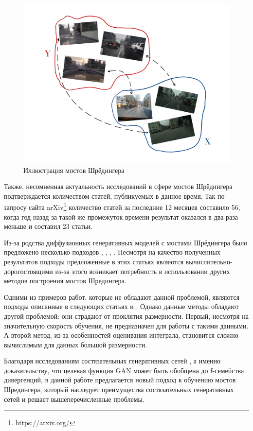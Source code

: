 \begin{figure}
    \centering
    \includegraphics[scale=0.2]{images/bridges_example.jpg}
    \caption{Иллюстрация мостов Шрёдингера}
    \label{fig:bridges_example}
\end{figure}

Также, несомненная актуальность исследований в сфере мостов Шрёдингера подтверждается количеством статей, публикуемых в данное время. Так по запросу сайта arXiv\footnote{https://arxiv.org/} количество статей за последние 12 месяцев составило 56, когда год назад за такой же промежуток времени результат оказался в два раза меньше и составил 23 статьи.

Из-за родства диффузионных генеративных моделей с мостами Шрёдингера было предложено несколько подходов \cite{dsb}, \cite{dsbm}, \cite{mle-sb}, \cite{cycle-sb}. Несмотря на качество полученных результатов подходы предложенные в этих статьях являются вычислительно-дорогостоящими из-за этого возникает потребность в использовании других методов построения мостов Шредингера. 

Одними из примеров работ, которые не обладают данной проблемой, являются подходы описанные в следующих статьях \cite{lsb} и \cite{pavon-empiric-fortret}. Однако данные методы обладают другой проблемой: они страдают от проклятия размерности. Первый, несмотря на значительную скорость обучения, не предназначен для работы с такими данными. А второй метод, из-за особенностей оценивания интеграла, становится сложно вычислимым для данных большой размерности.

Благодаря исследованиям состязательных генеративных сетей \cite{fgan}, а именно доказательству, что целевая функция GAN может быть обобщена до f-семейства дивергенций, в данной работе предлагается новый подход к обучению мостов Шредингера, который наследует преимущества состязательных генеративных сетей и решает вышеперечисленные проблемы.

\newpage
